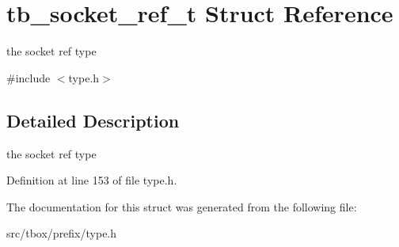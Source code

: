 \hypertarget{structtb__socket__ref__t}{\section{tb\-\_\-socket\-\_\-ref\-\_\-t Struct Reference}
\label{structtb__socket__ref__t}
}


the socket ref type  




{\ttfamily \#include $<$type.\-h$>$}



\subsection{Detailed Description}
the socket ref type 

Definition at line 153 of file type.\-h.



The documentation for this struct was generated from the following file\-:\begin{DoxyCompactItemize}
\item 
src/tbox/prefix/type.\-h\end{DoxyCompactItemize}
